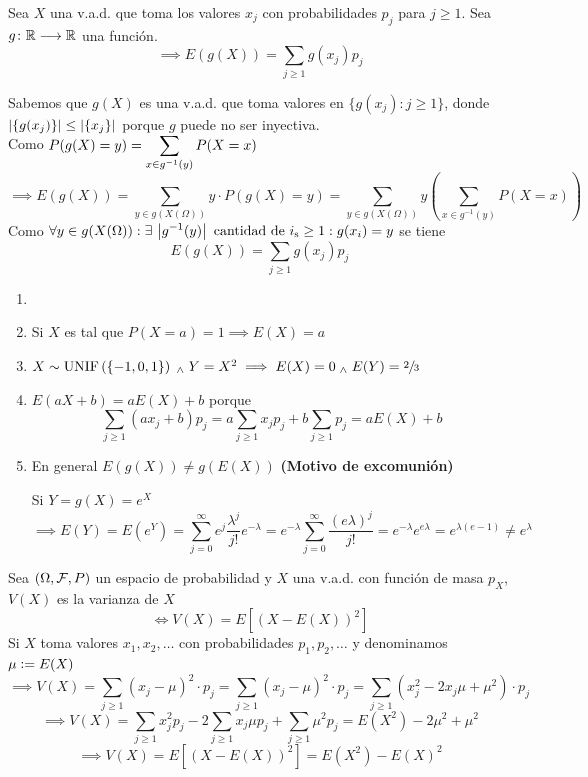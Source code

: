 \begin{teo} \label{teo:esperanzaporg}
	Sea $X$ una v.a.d. que toma los valores $x_j$ con probabilidades $p_j$ para $j \geq 1$. Sea $g \colon \mathbb{R} \longrightarrow \mathbb{R}$ una función.
	\[\implies E(g(X))=\sum_{j\geq 1}g(x_j)p_j\]
	\begin{dem}
		Sabemos que $g(X)$ es una v.a.d. que toma valores en $\{g(x_j) : j\geq 1\}$, donde $\left|\{g(x_j)\}\right|\leq\left|\{x_j\}\right|$ porque $g$ puede no ser inyectiva. \\
		Como $\displaystyle P(g(X)=y) = \sum_{x\in g^{-1}(y)} P(X=x)$
		\[\implies E(g(X))=\sum_{y\in g(X(\Omega))}y\cdot P(g(X)=y)=\sum_{y\in g(X(\Omega))}y \left(\sum_{x\in g^{-1}(y)} P(X=x)\right)\]
		Como $\displaystyle \forall y \in g(X(\Omega)) : \exists \, \left|g^{-1}(y)\right| \text{ cantidad de } i_{\text{s}} \geq 1 : g(x_i)=y$ se tiene
		\[E(g(X))=\sum_{j\geq 1}g(x_j)p_j\]
	\end{dem}
\end{teo}

\begin{obs}
	\begin{enumerate}
		\item[]
		\item Si $X$ es tal que $P(X=a)=1\implies E(X)=a$
		\item $X \sim \operatorname{UNIF}\left(\{-1, 0, 1\}\right) \; _{\wedge} \; Y=X^2 \implies E(X)=0 \; _{\wedge} \; E(Y)=\sfrac{2}{3}$
		\item $E(aX+b)=aE(X)+b$ porque
		      \[\sum_{j\geq 1}(ax_j+b)p_j=a\sum_{j\geq 1}x_jp_j+b\sum_{j\geq 1}p_j=aE(X)+b\]
		\item En general $E(g(X)) \ne g(E(X))$ \hfill \textbf{(Motivo de excomunión)}
		      \begin{ejem}[$X\sim\poisson{\lambda} \implies E(X)=\lambda$]
			      Si $Y=g(X)=e^X$
			      \[\implies E(Y)=E(e^Y)=\sum_{j=0}^\infty e^j\frac{\lambda^j}{j!}e^{-\lambda}=e^{-\lambda}\sum_{j=0}^\infty \frac{(e\lambda)^{j}}{j!}=e^{-\lambda}e^{e\lambda}=e^{\lambda(e-1)}\ne e^\lambda\]
		      \end{ejem}
	\end{enumerate}
\end{obs}

\begin{defn}[Varianza]
	Sea $(\Omega, \mathcal{F}, P)$ un espacio de probabilidad y $X$ una v.a.d. con función de masa $p_X$, $V(X)$ es la varianza de $X$
	\[\iff V(X)=E\left[(X-E(X))^2\right]\]
	Si $X$ toma valores $x_1, x_2, \dots$ con probabilidades $p_1, p_2, \dots$ y denominamos $\mu \vcentcolon= E(X)$
	\[\implies V(X)=\sum_{j\geq 1}(x_j-\mu)^2\cdot p_j = \sum_{j\geq 1}(x_j-\mu)^2\cdot p_j = \sum_{j\geq 1}(x_j^2-2x_j\mu+\mu^2)\cdot p_j\]
	\[\implies V(X)=\sum_{j\geq 1}x_j^2p_j -2\sum_{j\geq 1}x_j\mu p_j +\sum_{j\geq 1}\mu^2p_j = E(X^2)-2\mu^2+\mu^2\]
	\[\implies \boxed{V(X) = E\left[\left(X-E(X)\right)^2\right] = E\left(X^2\right)-{E(X)}^2}\]
\end{defn}

